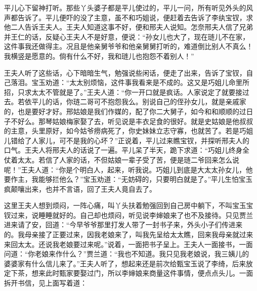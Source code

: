 \begin{parag}
    平儿心下留神打听。那些丫头婆子都是平儿使过的，平儿一问，所有听见外头的风声都告诉了。平儿便吓的没了主意，虽不和巧姐说，便赶着去告诉了李纨宝钗，求他二人告诉王夫人。王夫人知道这事不好，便和邢夫人说知。怎奈邢夫人信了兄弟并王仁的话，反疑心王夫人不是好意，便说：“孙女儿也大了，现在琏儿不在家，这件事我还做得主。况且是他亲舅爷爷和他亲舅舅打听的，难道倒比别人不真么！我横竖是愿意的。倘有什么不好，我和琏儿也抱怨不着别人！”
\end{parag}


\begin{parag}
    王夫人听了这些话，心下暗暗生气，勉强说些闲话，便走了出来，告诉了宝钗，自己落泪。宝玉劝道：“太太别烦恼，这件事我看来是不成的。这又是巧姐儿命里所招，只求太太不管就是了。”王夫人道：“你一开口就是疯话。人家说定了就要接过去。若依平儿的话，你琏二哥可不抱怨我么。别说自己的侄孙女儿，就是亲戚家的，也是要好才好。邢姑娘是我们作媒的，配了你二大舅子，如今和和顺顺的过日子不好么。那琴姑娘梅家娶了去，听见说是丰衣足食的很好。就是史姑娘是他叔叔的主意，头里原好，如今姑爷痨病死了，你史妹妹立志守寡，也就苦了。若是巧姐儿错给了人家儿，可不是我的心坏？”正说着，平儿过来瞧宝钗，并探听邢夫人的口气。王夫人将邢夫人的话说了一遍。平儿呆了半天，跪下求道：“巧姐儿终身全仗着太太。若信了人家的话，不但姑娘一辈子受了苦，便是琏二爷回来怎么说呢！”王夫人道：“你是个明白人，起来，听我说。巧姐儿到底是大太太孙女儿，他要作主，我能够拦他么？”宝玉劝道：“无妨碍的，只要明白就是了。”平儿生怕宝玉疯颠嚷出来，也并不言语，回了王夫人竟自去了。
\end{parag}


\begin{parag}
    这里王夫人想到烦闷，一阵心痛，叫丫头扶着勉强回到自己房中躺下，不叫宝玉宝钗过来，说睡睡就好的。自己却也烦闷，听见说李婶娘来了也不及接待。只见贾兰进来请了安，回道：“今早爷爷那里打发人带了一封书子来，外头小子们传进来的。我母亲接了正要过来，因我老娘来了，叫我先呈给太太瞧，回来我母亲就过来来回太太。还说我老娘要过来呢。”说着，一面把书子呈上。王夫人一面接书，一面问道：“你老娘来作什么？”贾兰道：“我也不知道。我只见我老娘说，我三姨儿的婆婆家有什么信儿来了。”王夫人听了，想起来还是前次给甄宝玉说了李绮，后来放定下茶，想来此时甄家要娶过门，所以李婶娘来商量这件事情，便点点头儿。一面拆开书信，见上面写着道：
\end{parag}


